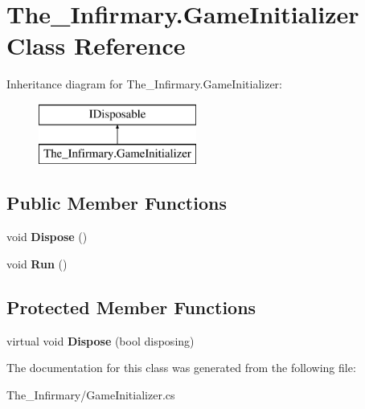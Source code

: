 \hypertarget{class_the___infirmary_1_1_game_initializer}{}\section{The\+\_\+\+Infirmary.\+Game\+Initializer Class Reference}
\label{class_the___infirmary_1_1_game_initializer}
Inheritance diagram for The\+\_\+\+Infirmary.\+Game\+Initializer\+:\begin{figure}[H]
\begin{center}
\leavevmode
\includegraphics[height=2.000000cm]{class_the___infirmary_1_1_game_initializer}
\end{center}
\end{figure}
\subsection*{Public Member Functions}
\begin{DoxyCompactItemize}
\item 
\mbox{\label{class_the___infirmary_1_1_game_initializer_a143902a9db2c1c3bfef45786b9bc667e}} 
void {\bfseries Dispose} ()
\item 
\mbox{\label{class_the___infirmary_1_1_game_initializer_ae0ec26ed8a3ed9caecbb5ec5c34ed7ae}} 
void {\bfseries Run} ()
\end{DoxyCompactItemize}
\subsection*{Protected Member Functions}
\begin{DoxyCompactItemize}
\item 
\mbox{\label{class_the___infirmary_1_1_game_initializer_a5283de35509d5c95f36600267a5d8d5f}} 
virtual void {\bfseries Dispose} (bool disposing)
\end{DoxyCompactItemize}


The documentation for this class was generated from the following file\+:\begin{DoxyCompactItemize}
\item 
The\+\_\+\+Infirmary/Game\+Initializer.\+cs\end{DoxyCompactItemize}
